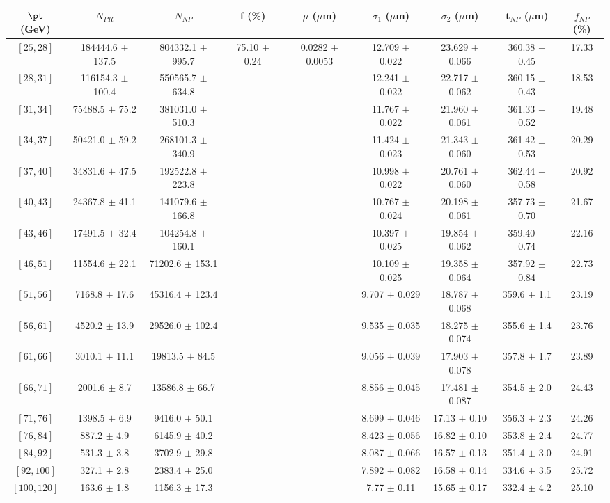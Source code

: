 \begin{tabular}{c||c|c|c|c|c|c|c||c}
$\pt$ (GeV) & $N_{PR}$ & $N_{NP}$ & f (\%) & $\mu$ ($\mu$m) & $\sigma_1$ ($\mu$m) & $\sigma_2$ ($\mu$m)  & t$_{NP}$ ($\mu$m) & $f_{NP}$ (\%) \\
\hline
$[25, 28]$ & 184444.6 $\pm$ 137.5 & 804332.1 $\pm$ 995.7 & \multirow{17}{*}{75.10 $\pm$ 0.24} & \multirow{17}{*}{0.0282 $\pm$ 0.0053} & 12.709 $\pm$ 0.022 & 23.629 $\pm$ 0.066 & 360.38 $\pm$ 0.45 & 17.33\\
$[28, 31]$ & 116154.3 $\pm$ 100.4 & 550565.7 $\pm$ 634.8 &  &  & 12.241 $\pm$ 0.022 & 22.717 $\pm$ 0.062 & 360.15 $\pm$ 0.43 & 18.53\\
$[31, 34]$ & 75488.5 $\pm$ 75.2 & 381031.0 $\pm$ 510.3 &  &  & 11.767 $\pm$ 0.022 & 21.960 $\pm$ 0.061 & 361.33 $\pm$ 0.52 & 19.48\\
$[34, 37]$ & 50421.0 $\pm$ 59.2 & 268101.3 $\pm$ 340.9 &  &  & 11.424 $\pm$ 0.023 & 21.343 $\pm$ 0.060 & 361.42 $\pm$ 0.53 & 20.29\\
$[37, 40]$ & 34831.6 $\pm$ 47.5 & 192522.8 $\pm$ 223.8 &  &  & 10.998 $\pm$ 0.022 & 20.761 $\pm$ 0.060 & 362.44 $\pm$ 0.58 & 20.92\\
$[40, 43]$ & 24367.8 $\pm$ 41.1 & 141079.6 $\pm$ 166.8 &  &  & 10.767 $\pm$ 0.024 & 20.198 $\pm$ 0.061 & 357.73 $\pm$ 0.70 & 21.67\\
$[43, 46]$ & 17491.5 $\pm$ 32.4 & 104254.8 $\pm$ 160.1 &  &  & 10.397 $\pm$ 0.025 & 19.854 $\pm$ 0.062 & 359.40 $\pm$ 0.74 & 22.16\\
$[46, 51]$ & 11554.6 $\pm$ 22.1 & 71202.6 $\pm$ 153.1 &  &  & 10.109 $\pm$ 0.025 & 19.358 $\pm$ 0.064 & 357.92 $\pm$ 0.84 & 22.73\\
$[51, 56]$ & 7168.8 $\pm$ 17.6 & 45316.4 $\pm$ 123.4 &  &  & 9.707 $\pm$ 0.029 & 18.787 $\pm$ 0.068 & 359.6 $\pm$ 1.1 & 23.19\\
$[56, 61]$ & 4520.2 $\pm$ 13.9 & 29526.0 $\pm$ 102.4 &  &  & 9.535 $\pm$ 0.035 & 18.275 $\pm$ 0.074 & 355.6 $\pm$ 1.4 & 23.76\\
$[61, 66]$ & 3010.1 $\pm$ 11.1 & 19813.5 $\pm$ 84.5 &  &  & 9.056 $\pm$ 0.039 & 17.903 $\pm$ 0.078 & 357.8 $\pm$ 1.7 & 23.89\\
$[66, 71]$ & 2001.6 $\pm$ 8.7 & 13586.8 $\pm$ 66.7 &  &  & 8.856 $\pm$ 0.045 & 17.481 $\pm$ 0.087 & 354.5 $\pm$ 2.0 & 24.43\\
$[71, 76]$ & 1398.5 $\pm$ 6.9 & 9416.0 $\pm$ 50.1 &  &  & 8.699 $\pm$ 0.046 & 17.13 $\pm$ 0.10 & 356.3 $\pm$ 2.3 & 24.26\\
$[76, 84]$ & 887.2 $\pm$ 4.9 & 6145.9 $\pm$ 40.2 &  &  & 8.423 $\pm$ 0.056 & 16.82 $\pm$ 0.10 & 353.8 $\pm$ 2.4 & 24.77\\
$[84, 92]$ & 531.3 $\pm$ 3.8 & 3702.9 $\pm$ 29.8 &  &  & 8.087 $\pm$ 0.066 & 16.57 $\pm$ 0.13 & 351.4 $\pm$ 3.0 & 24.91\\
$[92, 100]$ & 327.1 $\pm$ 2.8 & 2383.4 $\pm$ 25.0 &  &  & 7.892 $\pm$ 0.082 & 16.58 $\pm$ 0.14 & 334.6 $\pm$ 3.5 & 25.72\\
$[100, 120]$ & 163.6 $\pm$ 1.8 & 1156.3 $\pm$ 17.3 &  &  & 7.77 $\pm$ 0.11 & 15.65 $\pm$ 0.17 & 332.4 $\pm$ 4.2 & 25.10\\
\end{tabular}
